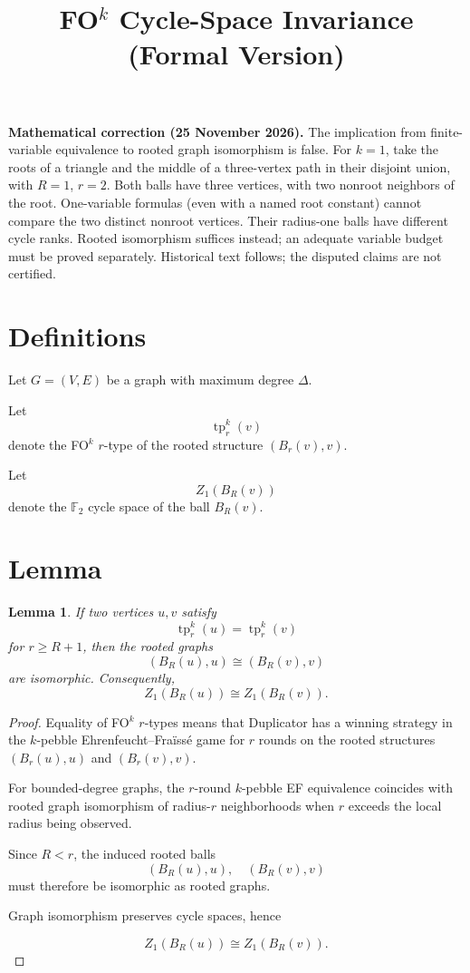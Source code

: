 \documentclass{article}
\newtheorem{lemma}{Lemma}
\begin{document}
\title{FO$^k$ Cycle-Space Invariance (Formal Version)}
\date{}
\maketitle
\par\noindent\textbf{Mathematical correction (25 November 2026).} The implication from finite-variable equivalence to rooted graph isomorphism is false. For $k=1$, take the roots of a triangle and the middle of a three-vertex path in their disjoint union, with $R=1$, $r=2$. Both balls have three vertices, with two nonroot neighbors of the root. One-variable formulas (even with a named root constant) cannot compare the two distinct nonroot vertices. Their radius-one balls have different cycle ranks. Rooted isomorphism suffices instead; an adequate variable budget must be proved separately. Historical text follows; the disputed claims are not certified.\par


\section*{Definitions}

Let $G=(V,E)$ be a graph with maximum degree $\Delta$.

Let
\[
\operatorname{tp}^k_r(v)
\]
denote the FO$^k$ $r$-type of the rooted structure $(B_r(v),v)$.

Let
\[
Z_1(B_R(v))
\]
denote the $\mathbb F_2$ cycle space of the ball $B_R(v)$.

\section*{Lemma}

\begin{lemma}
If two vertices $u,v$ satisfy
\[
\operatorname{tp}^k_r(u)=\operatorname{tp}^k_r(v)
\]
for $r \ge R+1$, then the rooted graphs
\[
(B_R(u),u) \cong (B_R(v),v)
\]
are isomorphic. Consequently,
\[
Z_1(B_R(u)) \cong Z_1(B_R(v)).
\]
\end{lemma}

\begin{proof}

Equality of FO$^k$ $r$-types means that Duplicator has a winning
strategy in the $k$-pebble Ehrenfeucht–Fraïssé game for $r$ rounds on
the rooted structures $(B_r(u),u)$ and $(B_r(v),v)$.

For bounded-degree graphs, the $r$-round $k$-pebble EF equivalence
coincides with rooted graph isomorphism of radius-$r$ neighborhoods
when $r$ exceeds the local radius being observed.

Since $R < r$, the induced rooted balls
\[
(B_R(u),u), \quad (B_R(v),v)
\]
must therefore be isomorphic as rooted graphs.

Graph isomorphism preserves cycle spaces, hence

\[
Z_1(B_R(u)) \cong Z_1(B_R(v)).
\]

\end{proof}
\end{document}
